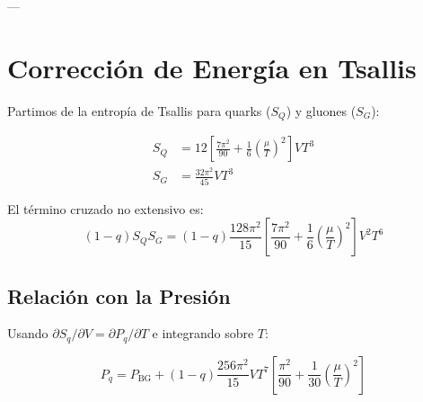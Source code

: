 


---


\section{Corrección de Energía en Tsallis} \label{app:tsallis-energy}
Partimos de la entropía de Tsallis para quarks ($S_Q$) y gluones ($S_G$):

\begin{align}
S_Q &= 12\left[\frac{7\pi^2}{90} + \frac{1}{6}\left(\frac{\mu}{T}\right)^2\right]VT^3 \label{eq:SQ} \\
S_G &= \frac{32\pi^2}{45}VT^3 \label{eq:SG}
\end{align}

El término cruzado no extensivo es:
\begin{equation} \label{eq:cross-term}
(1-q)S_Q S_G = (1-q)\frac{128\pi^2}{15}\left[\frac{7\pi^2}{90} + \frac{1}{6}\left(\frac{\mu}{T}\right)^2\right]V^2T^6
\end{equation}

\subsection{Relación con la Presión}
Usando $\partial S_q/\partial V = \partial P_q/\partial T$ e integrando sobre $T$:

\begin{equation}
P_q = P_{\text{BG}} + (1-q)\frac{256\pi^2}{15}VT^7\left[\frac{\pi^2}{90} + \frac{1}{30}\left(\frac{\mu}{T}\right)^2\right]
\end{equation}


